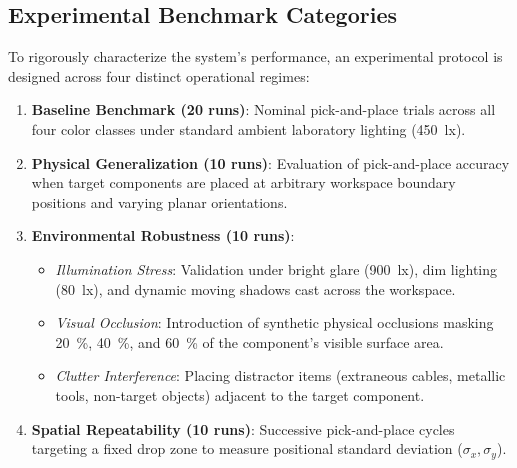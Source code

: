 \documentclass[runningheads]{llncs}
\begin{document}
\subsection{Experimental Benchmark Categories}
To rigorously characterize the system's performance, an experimental protocol is designed across four distinct operational regimes:
\begin{enumerate}
    \item \textbf{Baseline Benchmark (20 runs)}: Nominal pick-and-place trials across all four color classes under standard ambient laboratory lighting (\SI{450}{\lux}).
    \item \textbf{Physical Generalization (10 runs)}: Evaluation of pick-and-place accuracy when target components are placed at arbitrary workspace boundary positions and varying planar orientations.
    \item \textbf{Environmental Robustness (10 runs)}:
    \begin{itemize}
        \item \textit{Illumination Stress}: Validation under bright glare (\SI{900}{\lux}), dim lighting (\SI{80}{\lux}), and dynamic moving shadows cast across the workspace.
        \item \textit{Visual Occlusion}: Introduction of synthetic physical occlusions masking \SI{20}{\percent}, \SI{40}{\percent}, and \SI{60}{\percent} of the component's visible surface area.
        \item \textit{Clutter Interference}: Placing distractor items (extraneous cables, metallic tools, non-target objects) adjacent to the target component.
    \end{itemize}
    \item \textbf{Spatial Repeatability (10 runs)}: Successive pick-and-place cycles targeting a fixed drop zone to measure positional standard deviation ($\sigma_x, \sigma_y$).
\end{enumerate}
\end{document}
